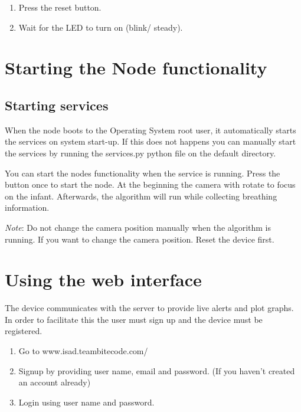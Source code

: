 \documentclass{report}
\begin{document}
\begin{enumerate}

  \item Press the reset button.
  \item Wait for the LED to turn on (blink/ steady).
  
\end{enumerate}


\section{Starting the Node functionality}
\subsection{Starting services}

When the node boots to the Operating System root user, it automatically starts the services on system start-up. If this does not happens you can manually start the services by running the services.py python file on the default directory.
\newline
\newline

You can start the nodes functionality when the service is running. Press the button once to start the node. At the beginning the camera with rotate to focus on the infant. Afterwards, the algorithm will run while collecting breathing information.

\newline
\newline
\emph{Note}: Do not change the camera position manually when the algorithm is running. If you want to change the camera position. Reset the device first.

\section{Using the web interface}

The device communicates with the server to provide live alerts and plot graphs. In order to facilitate this the user must sign up and the device must be registered.

\begin{enumerate}

  \item Go to www.isad.teambitecode.com/                         
  \item Signup by providing user name, email and password. (If you haven't created an account already)
  \item Login using user name and password.

\end{enumerate}
\end{document}
